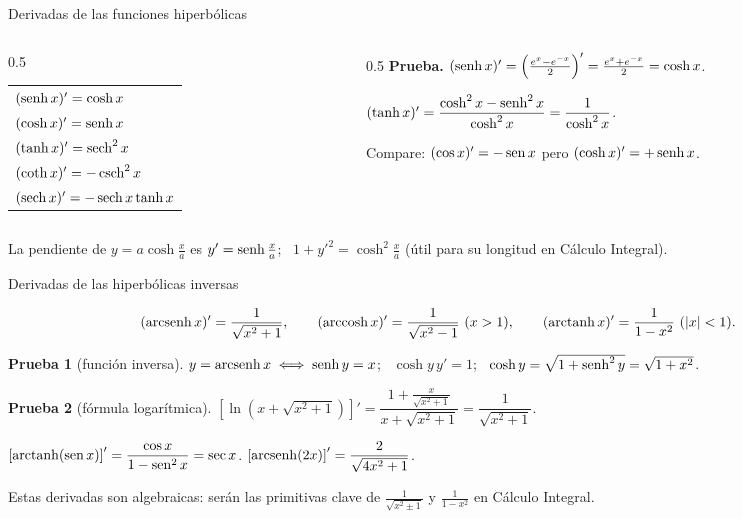 \documentclass[10pt,aspectratio=169]{beamer}
\begin{document}
\begin{frame}{Derivadas de las funciones hiperbólicas}
  \begin{columns}
    \begin{column}{0.5\textwidth}
      \begin{teorema}
        \renewcommand{\arraystretch}{1.4}
        \begin{tabular}{l}
          $(\operatorname{senh} x)'=\cosh x$\\
          $(\cosh x)'=\operatorname{senh} x$\\
          $(\tanh x)'=\operatorname{sech}^2x$\\
          $(\coth x)'=-\operatorname{csch}^2x$\\
          $(\operatorname{sech} x)'=-\operatorname{sech} x\tanh x$
        \end{tabular}
      \end{teorema}
    \end{column}
    \begin{column}{0.5\textwidth}
      \textbf{Prueba.} $(\operatorname{senh} x)'=\left(\frac{e^x-e^{-x}}2\right)'=\frac{e^x+e^{-x}}2=\cosh x$.
      \smallskip

      $(\tanh x)'=\dfrac{\cosh^2x-\operatorname{senh}^2x}{\cosh^2x}=\dfrac{1}{\cosh^2x}$.
      \begin{observacion}
        Compare: $(\cos x)'=-\operatorname{sen} x$ pero $(\cosh x)'=+\operatorname{senh} x$.
      \end{observacion}
    \end{column}
  \end{columns}
  \begin{ejemplo}[8: catenaria]
    La pendiente de $y=a\cosh\frac xa$ es $y'=\operatorname{senh}\frac xa$; \ $1+y'^2=\cosh^2\frac xa$ (útil para su longitud en Cálculo Integral).
  \end{ejemplo}
\end{frame}

\begin{frame}{Derivadas de las hiperbólicas inversas}
  \begin{teorema}
    \[ (\arcsenh x)'=\frac{1}{\sqrt{x^2+1}},\qquad(\arccosh x)'=\frac{1}{\sqrt{x^2-1}}\ (x>1),\qquad(\arctanh x)'=\frac{1}{1-x^2}\ (|x|<1). \]
  \end{teorema}
  \textbf{Prueba 1} (función inversa). $y=\operatorname{arcsenh} x\iff\operatorname{senh} y=x$; \ $\cosh y\,y'=1$; \ $\cosh y=\sqrt{1+\operatorname{senh}^2y}=\sqrt{1+x^2}$.
  \smallskip

  \textbf{Prueba 2} (fórmula logarítmica). $\left[\ln\left(x+\sqrt{x^2+1}\right)\right]'=\dfrac{1+\frac{x}{\sqrt{x^2+1}}}{x+\sqrt{x^2+1}}=\dfrac{1}{\sqrt{x^2+1}}$.
  \begin{ejemplo}[9]
    $\left[\operatorname{arctanh}(\operatorname{sen} x)\right]'=\dfrac{\cos x}{1-\operatorname{sen}^2x}=\sec x$. \qquad $\left[\operatorname{arcsenh}(2x)\right]'=\dfrac{2}{\sqrt{4x^2+1}}$.
  \end{ejemplo}
  \begin{idea}
    Estas derivadas son algebraicas: serán las primitivas clave de $\frac{1}{\sqrt{x^2\pm1}}$ y $\frac{1}{1-x^2}$ en Cálculo Integral.
  \end{idea}
\end{frame}
\end{document}
